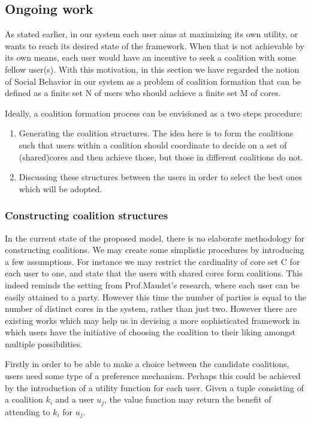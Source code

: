 \documentclass{article}
\begin{document}
\subsection{Ongoing work}

As stated earlier, in our system each user aims at maximizing its own utility, or wants to reach its desired state of the framework. When that is not achievable by its own means, each user would have an incentive to seek a coalition with some fellow user(s). 
With this motivation, in this section we have regarded the notion of Social Behavior in our system as a problem of coalition formation that can be defined as a finite set N of users who should achieve a finite set M of cores. 

Ideally, a coalition formation process can be envisioned as a two steps procedure:
\begin{enumerate}
\item Generating the coalition structures. The idea here is to form the coalitions such that
users within a coalition should coordinate to decide on a set of (shared)cores and then achieve those, but
those in different coalitions do not.
\item Discussing these structures between the users in order to select the best ones which
will be adopted.
\end{enumerate}

\subsubsection{Constructing coalition structures}

In the current state of the proposed model, there is no elaborate methodology for constructing coalitions. We may create some simplistic procedures by introducing a few assumptions. For instance we may restrict the cardinality of core set C for each user to one, and state that the users with shared cores form coalitions. This indeed reminds the setting from Prof.Maudet's research, where each user can be easily attained to a party. However this time the number of parties is equal to the number of distinct cores in the system, rather than just two. However there are existing works which may help us in devising a more sophisticated framework in which users have the initiative of choosing the coalition to their liking amongst multiple possibilities. 

Firstly in order to be able to make a choice between the candidate coalitions, users need some type of a preference mechanism. Perhaps this could be achieved by the introduction of a utility function for each user. Given a tuple consisting of a coalition $k_i$ and a user $u_j$,  the value function may return the benefit of attending to $k_i$ for $u_j$.
\end{document}

